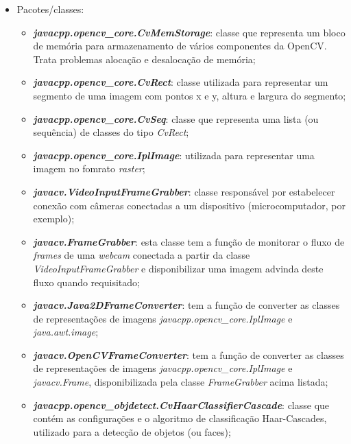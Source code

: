 \begin{itemize}
	\item Pacotes/classes:
	\begin{itemize}
		\item \textit{\textbf{javacpp.opencv\_core.CvMemStorage}}: classe que representa um bloco de memória para armazenamento de vários componentes da OpenCV. Trata problemas alocação e desalocação de memória;
		
		\item \textbf{\textit{javacpp.opencv\_core.CvRect}}: classe utilizada para representar um segmento de uma imagem com pontos x e y, altura e largura do segmento;
		
		\item \textbf{\textit{javacpp.opencv\_core.CvSeq}}: classe que representa uma lista (ou sequência) de classes do tipo \textit{CvRect};
		
		\item \textbf{\textit{javacpp.opencv\_core.IplImage}}: utilizada para representar uma imagem no fomrato \textit{raster};
		
		\item \textbf{\textit{javacv.VideoInputFrameGrabber}}:	classe responsável por estabelecer conexão com câmeras conectadas a um dispositivo (microcomputador, por exemplo);

		\item \textbf{\textit{javacv.FrameGrabber}}: esta classe tem a função de monitorar o fluxo de \textit{frames} de uma \textit{webcam} conectada a partir da classe \textit{VideoInputFrameGrabber} e disponibilizar uma imagem advinda deste fluxo quando requisitado;		
			
		\item \textbf{\textit{javacv.Java2DFrameConverter}}: tem a função de converter as classes de representações de imagens \textit{javacpp.opencv\_core.IplImage} e \textit{java.awt.image};
		
		\item \textbf{\textit{javacv.OpenCVFrameConverter}}: tem a função de converter as classes de representações de imagens \textit{javacpp.opencv\_core.IplImage} e \textit{javacv.Frame}, disponibilizada pela classe \textit{FrameGrabber} acima listada;
		
		\item \textbf{\textit{javacpp.opencv\_objdetect.CvHaarClassifierCascade}}: classe que contém as configurações e o algoritmo de classificação Haar-Cascades, utilizado para a detecção de objetos (ou faces);
	\end{itemize}


\end{itemize}
